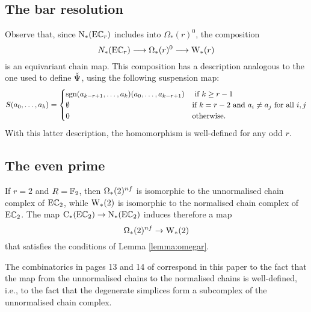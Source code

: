 \subsection{The bar resolution}\label{ss:milnor}
Observe that, since $\operatorname{N}_*(\mathrm{E}\mathbb{C}_r)$ includes into $\Omega_*(r)^0$, the composition
\[
N_*(\mathrm{E}\mathbb{C}_r)\longrightarrow \Omega_*(r)^0\longrightarrow \mathrm{W}_*(r)
\]
is an equivariant chain map. This composition has a description analogous to the one used to define $\operatorname{\check{\Psi}}$, using the following suspension map:
\[
S(a_0,\ldots,a_k) = \begin{cases}
	{\operatorname*{sgn}(a_{k-r+1},\ldots,a_{k})} (a_{0},\ldots,a_{k-r+1}) & \text{ if $k\geq r-1$} \\
	\emptyset & \text{if $k = r-2$ and $a_i\neq a_j$ for all $i,j$} \\
	0 & \text{otherwise.}
\end{cases}
\]
With this latter description, the homomorphism is well-defined for any odd $r$.
\subsection{The even prime}\label{ss:even} If $r= 2$ and $R=\mathbb{F}_2$, then $\Omega_*(2)^{nf}$ is isomorphic to the unnormalised chain complex of $\mathrm{E}\mathbb{C}_2$, while $\mathrm{W}_*(2)$ is isomorphic to the normalised chain complex of $\mathrm{E}\mathbb{C}_2$. The map $\operatorname{C}_*(\mathrm{E}\mathbb{C}_2)\to \operatorname{N}_*(\mathrm{E}\mathbb{C}_2)$ induces therefore a map
\[
\Omega_*(2)^{nf}\to \mathrm{W}_*(2)
\]
that satisfies the conditions of Lemma \ref{lemma:omegar}.
\begin{remark}
	The combinatorics in pages 13 and 14 of \cite{medina2021fast_sq} correspond in this paper to the fact that the map from the unnormalised chains to the normalised chains is well-defined, i.e., to the fact that the degenerate simplices form a subcomplex of the unnormalised chain complex.
\end{remark}

